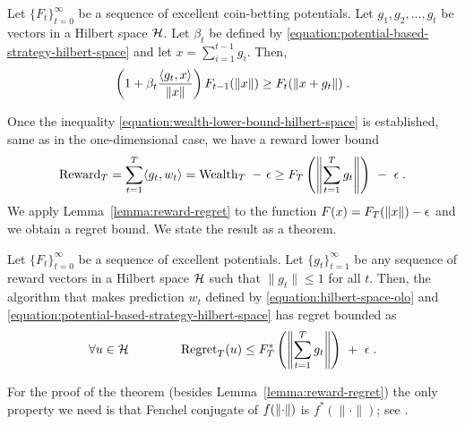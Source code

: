 \begin{lemma}
\label{lemma:recursion_hilbert}
Let $\{F_t\}_{t=0}^\infty$ be a sequence of excellent coin-betting potentials.
Let $g_1, g_2, \dots, g_t$ be vectors in a Hilbert space $\mathcal{H}$. Let $\beta_t$
be defined by \eqref{equation:potential-based-strategy-hilbert-space}
and let $x = \sum_{i=1}^{t-1} g_i$. Then,
$$
\left(1 + \beta_t \frac{\langle g_t, x \rangle}{\|x\|} \right) F_{t-1}(\left\|{x}\right\|)
\ge F_t(\left\|{x + g_t}\right\|) \; .
$$
\end{lemma}

Once the inequality \eqref{equation:wealth-lower-bound-hilbert-space} is
established, same as in the one-dimensional case, we have a reward lower bound
\begin{equation}
\label{equation:hilbert-space-olo-reward-lower-bound}
\operatorname{Reward}_T
= \sum_{t=1}^T \langle g_t, w_t \rangle
= \operatorname{Wealth}_T \ - \ \epsilon
\ge F_T\left(\left\|{\sum_{t=1}^T g_t}\right\| \right) \ - \ \epsilon \; .
\end{equation}
We apply Lemma~\ref{lemma:reward-regret} to the function $F(x) = F_T(\left\|{x}\right\|) -
\epsilon$ and we obtain a regret bound. We state the result as a theorem.

\begin{theorem}
\label{theorem:hilbert-space-olo-regret-bound}
Let $\{F_t\}_{t=0}^\infty$ be a sequence of excellent potentials. Let
$\{g_t\}_{t=1}^\infty$ be any sequence of reward vectors in a Hilbert space $\mathcal{H}$
such that $\|g_t\| \le 1$ for all $t$. Then, the algorithm that makes prediction
$w_t$ defined by \eqref{equation:hilbert-space-olo} and
\eqref{equation:potential-based-strategy-hilbert-space} has regret bounded as
$$
\forall u \in \H \qquad \qquad
\Regret_T(u) \le F_T^*\left(\norm{\sum_{t=1}^T g_t} \right) \ + \ \epsilon \; .
$$
\end{theorem}

For the proof of the theorem (besides Lemma~\ref{lemma:reward-regret})
the only property we need is that Fenchel conjugate of $f(\left\|{\cdot}\right\|)$
is $f^*(\|\cdot\|)$; see \citet[Example 13.7]{BauschkeC2011}.
